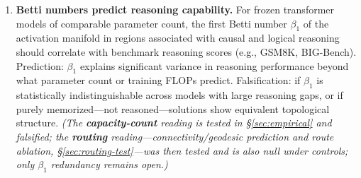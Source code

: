 \documentclass{article}
\begin{document}
\begin{enumerate}
    \item \textbf{Betti numbers predict reasoning capability.} For frozen transformer models of comparable parameter count, the first Betti number $\beta_1$ of the activation manifold in regions associated with causal and logical reasoning should correlate with benchmark reasoning scores (e.g., GSM8K, BIG-Bench). Prediction: $\beta_1$ explains significant variance in reasoning performance beyond what parameter count or training FLOPs predict. Falsification: if $\beta_1$ is statistically indistinguishable across models with large reasoning gaps, or if purely memorized---not reasoned---solutions show equivalent topological structure. \emph{(The \textbf{capacity-count} reading is tested in \S\ref{sec:empirical} and falsified; the \textbf{routing} reading---connectivity/geodesic prediction and route ablation, \S\ref{sec:routing-test}---was then tested and is also null under controls; only $\beta_1$ redundancy remains open.)}


\end{enumerate}
\end{document}

